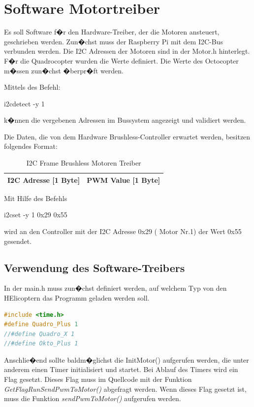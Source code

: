 \section{Software Motortreiber}

Es soll Software f�r den Hardware-Treiber, der die Motoren ansteuert, geschrieben werden. Zun�chst muss der Raspberry Pi mit dem I2C-Bus verbunden werden. 
Die I2C Adressen der Motoren sind in der Motor.h hinterlegt. F�r die Quadrocopter wurden die Werte definiert. Die Werte des Octocopter m�ssen zun�chst �berpr�ft werden.

Mittels des Befehl:

\begin{center}
	i2cdetect -y 1
\end{center}

k�nnen die vergebenen Adressen im Bussystem angezeigt und validiert werden.

Die Daten, die von dem Hardware Brushless-Controller erwartet werden, besitzen folgendes Format:

	\begin{table}[H]
		\centering
		\begin{tabular}{|c|c|}
			\hline
			I2C Adresse [1 Byte] & PWM Value [1 Byte]\\ \hline
		\end{tabular}
	\caption{I2C Frame Brushless Motoren Treiber}
	\end{table}

Mit Hilfe des Befehls 

\begin{center}
	i2cset -y 1 0x29 0x55
\end{center}

wird an den Controller mit der I2C Adresse 0x29 ( Motor Nr.1) der Wert 0x55 gesendet.

\subsection{Verwendung des Software-Treibers}

In der main.h muss zun�chst definiert werden, auf welchem Typ von den HElicoptern das Programm geladen werden soll.
\begin{lstlisting}[language=C++]
#include <time.h>
#define Quadro_Plus 1
//#define Quadro_X 1
//#define Okto_Plus 1
\end{lstlisting}

Anschlie�end sollte baldm�glichst die InitMotor() aufgerufen werden, die unter anderem einen Timer initialisiert und startet. Bei Ablauf des Timers wird ein Flag gesetzt. Dieses Flag muss im Quellcode mit der Funktion \emph{GetFlagRunSendPwmToMotor()} abgefragt werden. Wenn dieses Flag gesetzt ist, muss die Funktion \emph{sendPwmToMotor()} aufgerufen werden.

